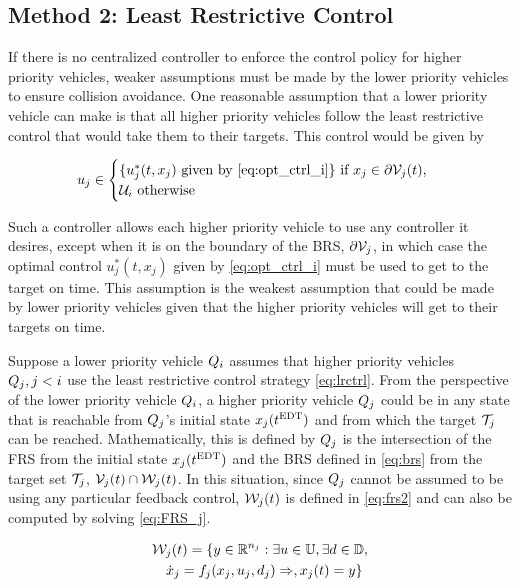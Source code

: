 \subsection{Method 2: Least Restrictive Control \label{sec:lrc}}
If there is no centralized controller to enforce the control policy for higher priority vehicles, weaker assumptions must be made by the lower priority vehicles to ensure collision avoidance. One reasonable assumption that a lower priority vehicle can make is that all higher priority vehicles follow the least restrictive control  that would take them to their targets. This control would be given by 

\begin{equation}
\label{eq:lrctrl} %
u_j \in \begin{cases} \{u_j^*(t, x_j) \text{ given by } \eqref{eq:opt_ctrl_i}\} \text{ if } x_j\in \partial \brs_j(t), \\
\cset_i  \text{ otherwise}
\end{cases}
\end{equation}

Such a controller allows each higher priority vehicle to use any controller it desires, except when it is on the boundary of the BRS, $\partial \mathcal{V}_j$, in which case the optimal control $u_j^*(t, x_j)$ given by \eqref{eq:opt_ctrl_i} must be used to get to the target on time. This assumption is the weakest assumption that could be made by lower priority vehicles given that the higher priority vehicles will get to their targets on time.

Suppose a lower priority vehicle $Q_i$ assumes that higher priority vehicles $Q_j, j < i$ use the least restrictive control strategy \eqref{eq:lrctrl}. From the perspective of the lower priority vehicle $Q_i$, a higher priority vehicle $Q_j$ could be in any state that is reachable from $Q_j$'s initial state $x_j(t^\text{EDT})$ and from which the target $\mathcal{T}_j$ can be reached. Mathematically, this is defined by $Q_j$ is the intersection of the FRS from the initial state $x_j(t^\text{EDT})$ and the BRS defined in \eqref{eq:brs} from the target set $\mathcal{T}_j$, $\mathcal{V}_j(t) \cap \mathcal{W}_j(t)$. In this situation, since $Q_j$ cannot be assumed to be using any particular feedback control, $\mathcal{W}_j(t)$ is defined in \eqref{eq:frs2} and can also be computed by solving \eqref{eq:FRS_j}.

\begin{equation}
\label{eq:frs2}
\begin{aligned}
&\mathcal{W}_j(t) = \{y \in \mathbb{R}^{n_j}: \exists u \in \mathbb{U}, \exists d \in \mathbb{D}, \\
& \quad \dot{x}_j = f_j(x_j, u_j, d_j) \Rightarrow, x_j(t) = y\}
\end{aligned}
\end{equation}


